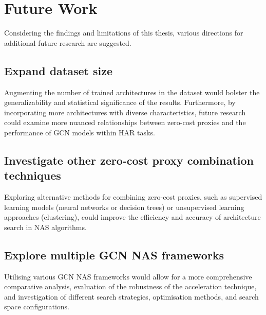 \section{Future Work}

Considering the findings and limitations of this thesis, various directions for additional future research are suggested.

\subsection{Expand dataset size}
Augmenting the number of trained architectures in the dataset would bolster the generalizability and statistical significance of the results. Furthermore, by incorporating more architectures with diverse characteristics, future research could examine more nuanced relationships between zero-cost proxies and the performance of \gls{GCN} models within \gls{HAR} tasks.

\subsection{Investigate other zero-cost proxy combination techniques}
Exploring alternative methods for combining zero-cost proxies, such as supervised learning models (neural networks or decision trees) or unsupervised learning approaches (clustering), could improve the efficiency and accuracy of architecture search in \gls{NAS} algorithms.

\begin{comment}
\subsection{Develop new zero-cost proxy metrics}
Identifying new zero-cost proxy metrics with stronger correlations to validation accuracy could further enhance the efficacy of combined zero-cost proxy metrics in \gls{NAS} for \gls{GCN}.
\end{comment}

\subsection{Explore multiple \gls{GCN} \gls{NAS} frameworks}
Utilising various \gls{GCN} \gls{NAS} frameworks would allow for a more comprehensive comparative analysis, evaluation of the robustness of the acceleration technique, and investigation of different search strategies, optimisation methods, and search space configurations.

